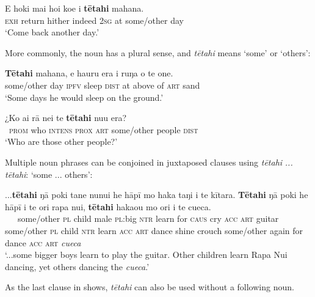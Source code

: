 \ea\label{ex:4.83}
\gll E hoki mai ho{\ꞌ}i koe {\ꞌ}i \textbf{tētahi} mahana. \\
\textsc{exh} return hither indeed \textsc{2sg} at some/other day \\

\glt
‘Come back another day.’ \textstyleExampleref{[R344.034]} 
\z

More commonly, the noun has a plural sense, and \textit{tētahi} means ‘some’ or ‘others’:

\ea\label{ex:4.84}
\gll \textbf{Tētahi} mahana, e ha{\ꞌ}uru era {\ꞌ}i ruŋa o te {\ꞌ}one. \\
some/other day \textsc{ipfv} sleep \textsc{dist} at above of \textsc{art} sand \\

\glt 
‘Some days he would sleep on the ground.’ \textstyleExampleref{[R309.060]} 
\z

\ea\label{ex:4.85}
\gll ¿Ko ai rā nei te \textbf{tētahi} nu{\ꞌ}u era? \\
~\textsc{prom} who \textsc{intens} \textsc{prox} \textsc{art} some/other people \textsc{dist} \\

\glt
‘Who are those other people?’ \textstyleExampleref{[R414.075]} 
\z

Multiple noun phrases can be conjoined in juxtaposed clauses using \textit{tētahi} \textit{... tētahi}: ‘some ... others’:

\ea\label{ex:4.86}
\gll ...\textbf{tētahi} ŋā poki tane nunui he hāpī mo haka taŋi i te kītara.  \textbf{Tētahi} ŋā poki he hāpī i te {\ꞌ}ori rapa nui, \textbf{tētahi} haka{\ꞌ}ou mo {\ꞌ}ori i te cueca.\\
~~~some/other \textsc{pl} child male \textsc{pl}:big \textsc{ntr} learn for \textsc{caus} cry \textsc{acc} \textsc{art} guitar some/other \textsc{pl} child \textsc{ntr} learn \textsc{acc} \textsc{art} dance shine crouch some/other again for dance \textsc{acc} \textsc{art} \textit{cueca}\\

\glt
‘...some bigger boys learn to play the guitar. Other children learn Rapa Nui dancing, yet others dancing the \textit{cueca}.’ \textstyleExampleref{[R334.130–131]}
\z

As the last clause in  shows, \textit{tētahi} can also be used without a following noun.


